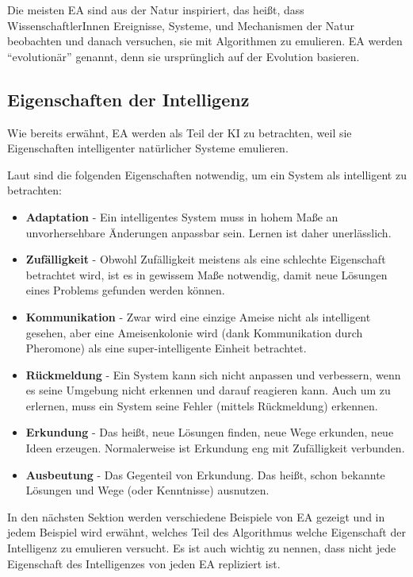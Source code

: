 \documentclass[twoside,twocolumn]{article}
\begin{document}
Die meisten EA sind aus der Natur inspiriert, das heißt, dass WissenschaftlerInnen Ereignisse, Systeme, und Mechanismen der Natur beobachten und danach versuchen, sie mit Algorithmen zu emulieren. EA werden \enquote{evolutionär} genannt, denn sie ursprünglich auf der Evolution basieren. \cite{holland_ga}

\subsection{Eigenschaften der Intelligenz}
Wie bereits erwähnt, EA werden als Teil der KI zu betrachten, weil sie Eigenschaften intelligenter natürlicher Systeme emulieren.\par
Laut \cite[Kapitel 2.7]{wiley_evolutionary} sind die folgenden Eigenschaften notwendig, um ein System als intelligent zu betrachten:

\begin{itemize}
\item{\textbf{Adaptation} - Ein intelligentes System muss in hohem Maße an unvorhersehbare Änderungen anpassbar sein. Lernen ist daher unerlässlich.}
\item{\textbf{Zufälligkeit} - Obwohl Zufälligkeit meistens als eine schlechte Eigenschaft betrachtet wird, ist es in gewissem Maße notwendig, damit neue Lösungen eines Problems gefunden werden können.}
\item{\textbf{Kommunikation} -  Zwar wird eine einzige Ameise nicht als intelligent gesehen, aber eine Ameisenkolonie wird (dank Kommunikation durch Pheromone) als eine super-intelligente Einheit betrachtet.}
\item{\textbf{Rückmeldung} - Ein System kann sich nicht anpassen und verbessern, wenn es seine Umgebung nicht erkennen und darauf reagieren kann. Auch um zu erlernen, muss ein System seine Fehler (mittels Rückmeldung) erkennen.}
\item{\textbf{Erkundung} - Das heißt, neue Lösungen finden, neue Wege erkunden, neue Ideen erzeugen. Normalerweise ist Erkundung eng mit Zufälligkeit verbunden.}
\item{\textbf{Ausbeutung} - Das Gegenteil von Erkundung. Das heißt, schon bekannte Lösungen und Wege (oder Kenntnisse) ausnutzen.}
\end{itemize}

In den nächsten Sektion werden verschiedene Beispiele von EA gezeigt und in jedem Beispiel wird erwähnt, welches Teil des Algorithmus welche Eigenschaft der Intelligenz  zu emulieren versucht. Es ist auch wichtig zu nennen, dass nicht jede Eigenschaft des Intelligenzes von jeden EA repliziert ist.
\end{document}
